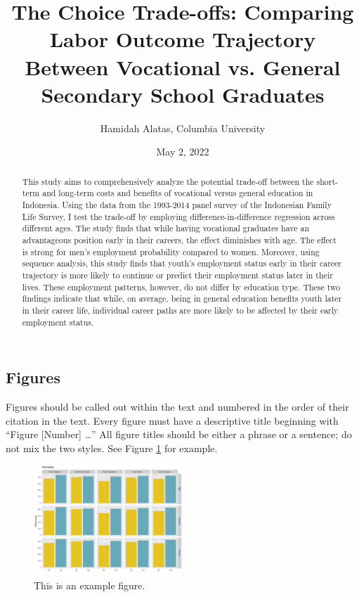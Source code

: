 \documentclass{article}
\title{The Choice Trade-offs: Comparing Labor Outcome Trajectory Between Vocational vs. General Secondary School Graduates}
\author {Hamidah Alatas, Columbia University}
\date{May 2, 2022}
\begin{document}
\maketitle

\begin{abstract}
This study aims to comprehensively analyze the potential trade-off between the short-term and long-term costs and benefits of vocational versus general education in Indonesia. Using the data from the 1993-2014 panel survey of the Indonesian Family Life Survey, I test the trade-off by employing difference-in-difference regression across different ages. The study finds that while having vocational graduates have an advantageous position early in their careers, the effect diminishes with age. The effect is strong for men's employment probability compared to women. Moreover, using sequence analysis, this study finds that youth's employment status early in their career trajectory is more likely to continue or predict their employment status later in their lives. These employment patterns, however, do not differ by education type. These two findings indicate that while, on average, being in general education benefits youth later in their career life, individual career paths are more likely to be affected by their early employment status.
\end{abstract}

\clearpage

\subsection*{Figures}
Figures should be called out within the text and numbered in the order of their citation in the text. Every figure must have a descriptive title beginning with ``Figure [Number] …'' All figure titles should be either a phrase or a sentence; do not mix the two styles. See Figure \ref{fig:1} for example.
\begin{figure}[h]
    \centering
    \includegraphics[width=0.5\textwidth]{indonesia_learning_gap.png}
    \caption{This is an example figure.}
    \label{fig:1}
\end{figure}
\end{document}
